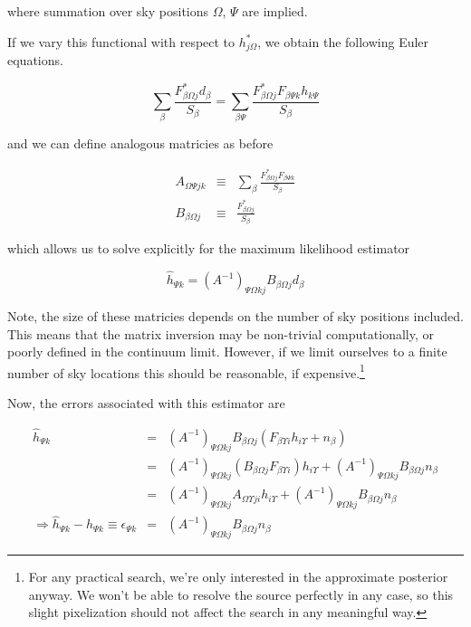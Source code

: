 \documentclass[10pt]{article}
\begin{document}
where summation over sky positions $\Omega$, $\Psi$ are implied.

If we vary this functional with respect to $h^\ast_{j\Omega}$, we obtain the following Euler equations.

\begin{equation}
\sum\limits_\beta \frac{F_{\beta \Omega j}^\ast d_\beta}{S_\beta} = \sum\limits_{\beta\Psi} \frac{F_{\beta\Omega j}^\ast F_{\beta \Psi k} h_{k \Psi}}{S_\beta}
\end{equation}

and we can define analogous matricies as before

\begin{eqnarray}
A_{\Omega\Psi j k} & \equiv & \sum\limits_\beta \frac{F_{\beta\Omega j}^\ast F_{\beta \Psi k}}{S_\beta} \\
B_{\beta\Omega j} & \equiv & \frac{F_{\beta\Omega j}^\ast}{S_\beta}
\end{eqnarray}

which allows us to solve explicitly for the maximum likelihood estimator

\begin{equation}
\hat{h}_{\Psi k} = \left(A^{-1}\right)_{\Psi\Omega k j} B_{\beta \Omega j} d_\beta
\end{equation}

Note, the size of these matricies depends on the number of sky positions included. This means that the matrix inversion may be non-trivial computationally, or poorly defined in the continuum limit. However, if we limit ourselves to a finite number of sky locations this should be reasonable, if expensive.\footnote{For any practical search, we're only interested in the approximate posterior anyway. We won't be able to resolve the source perfectly in any case, so this slight pixelization should not affect the search in any meaningful way.}

Now, the errors associated with this estimator are

\begin{eqnarray}
\hat{h}_{\Psi k} & = & \left(A^{-1}\right)_{\Psi\Omega k j} B_{\beta \Omega j} \left( F_{\beta \Upsilon i} h_{i\Upsilon} + n_\beta \right) \\
                 & = & \left(A^{-1}\right)_{\Psi\Omega k j} \left( B_{\beta \Omega j} F_{\beta \Upsilon i} \right) h_{i\Upsilon} +  \left(A^{-1}\right)_{\Psi\Omega k j} B_{\beta \Omega j} n_\beta \\
                 & = & \left(A^{-1}\right)_{\Psi\Omega k j} A_{\Omega\Upsilon j i} h_{i\Upsilon} +  \left(A^{-1}\right)_{\Psi\Omega k j} B_{\beta \Omega j} n_\beta \\
\Rightarrow \hat{h}_{\Psi k} - h_{\Psi k} \equiv \epsilon_{\Psi k} & = & \left(A^{-1}\right)_{\Psi\Omega k j} B_{\beta \Omega j} n_\beta
\end{eqnarray}
\end{document}
